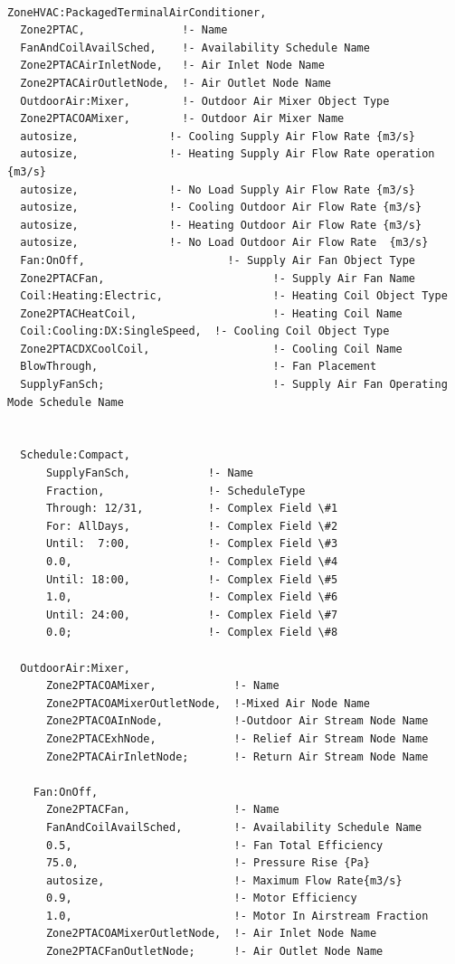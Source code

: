\begin{lstlisting}

ZoneHVAC:PackagedTerminalAirConditioner,
  Zone2PTAC,               !- Name
  FanAndCoilAvailSched,    !- Availability Schedule Name
  Zone2PTACAirInletNode,   !- Air Inlet Node Name
  Zone2PTACAirOutletNode,  !- Air Outlet Node Name
  OutdoorAir:Mixer,        !- Outdoor Air Mixer Object Type
  Zone2PTACOAMixer,        !- Outdoor Air Mixer Name
  autosize,              !- Cooling Supply Air Flow Rate {m3/s}
  autosize,              !- Heating Supply Air Flow Rate operation {m3/s}
  autosize,              !- No Load Supply Air Flow Rate {m3/s}
  autosize,              !- Cooling Outdoor Air Flow Rate {m3/s}
  autosize,              !- Heating Outdoor Air Flow Rate {m3/s}
  autosize,              !- No Load Outdoor Air Flow Rate  {m3/s}
  Fan:OnOff,                      !- Supply Air Fan Object Type
  Zone2PTACFan,                          !- Supply Air Fan Name
  Coil:Heating:Electric,                 !- Heating Coil Object Type
  Zone2PTACHeatCoil,                     !- Heating Coil Name
  Coil:Cooling:DX:SingleSpeed,  !- Cooling Coil Object Type
  Zone2PTACDXCoolCoil,                   !- Cooling Coil Name
  BlowThrough,                           !- Fan Placement
  SupplyFanSch;                          !- Supply Air Fan Operating Mode Schedule Name


  Schedule:Compact,
      SupplyFanSch,            !- Name
      Fraction,                !- ScheduleType
      Through: 12/31,          !- Complex Field \#1
      For: AllDays,            !- Complex Field \#2
      Until:  7:00,            !- Complex Field \#3
      0.0,                     !- Complex Field \#4
      Until: 18:00,            !- Complex Field \#5
      1.0,                     !- Complex Field \#6
      Until: 24:00,            !- Complex Field \#7
      0.0;                     !- Complex Field \#8

  OutdoorAir:Mixer,
      Zone2PTACOAMixer,            !- Name
      Zone2PTACOAMixerOutletNode,  !-Mixed Air Node Name
      Zone2PTACOAInNode,           !-Outdoor Air Stream Node Name
      Zone2PTACExhNode,            !- Relief Air Stream Node Name
      Zone2PTACAirInletNode;       !- Return Air Stream Node Name

    Fan:OnOff,
      Zone2PTACFan,                !- Name
      FanAndCoilAvailSched,        !- Availability Schedule Name
      0.5,                         !- Fan Total Efficiency
      75.0,                        !- Pressure Rise {Pa}
      autosize,                    !- Maximum Flow Rate{m3/s}
      0.9,                         !- Motor Efficiency
      1.0,                         !- Motor In Airstream Fraction
      Zone2PTACOAMixerOutletNode,  !- Air Inlet Node Name
      Zone2PTACFanOutletNode;      !- Air Outlet Node Name


\end{lstlisting}
